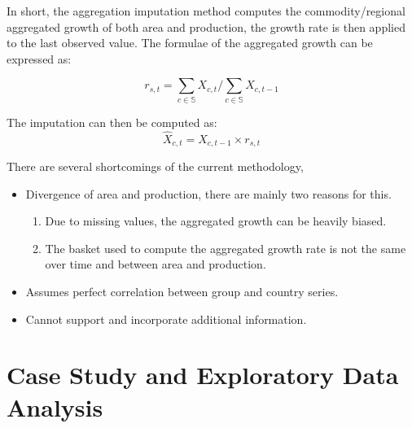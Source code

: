 \documentclass{beamer}
\begin{document}
\begin{frame}

  In short, the aggregation imputation method computes the
  commodity/regional aggregated growth of both area and production,
  the growth rate is then applied to the last observed value. The
  formulae of the aggregated growth can be expressed as:
  
  \begin{equation}
    \label{eq:aggregateGrowth}
    r_{s, t} = \sum_{c \in \mathbb{S}} X_{c, t}/\sum_{c \in \mathbb{S}} X_{c, t-1}
  \end{equation}
  
  The imputation can then be computed as:
  \begin{equation}
    \hat{X}_{c, t} = X_{c, t-1} \times r_{s, t}
  \end{equation}
  
\end{frame}

\begin{frame}
  There are several shortcomings of the current methodology,
  \begin{itemize}
  \item Divergence of area and production, there are mainly two reasons for this.
    \begin{enumerate}
      \item Due to missing values, the aggregated growth can be heavily biased.
      \item The basket used to compute the aggregated growth rate is
        not the same over time and between area and production.
    \end{enumerate}
  \item Assumes perfect correlation between group and country series.
  \item Cannot support and incorporate additional information.
  \end{itemize}
\end{frame}

\section{Case Study and Exploratory Data Analysis}

\end{document}
